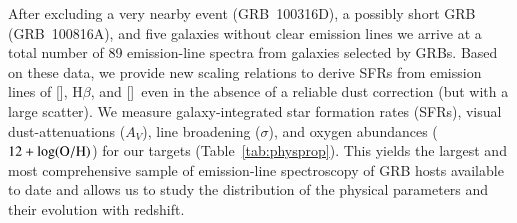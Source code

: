 \documentclass[traditabstract, longauth]{aa}
\newcommand{\hb}{H$\beta$}
\newcommand{\oh}{12+\log(\rm{O/H})}
\newcommand{\oii}{[\ion{O}{ii}]}
\newcommand{\oiii}{[\ion{O}{iii}]}
\begin{document}
After excluding a very nearby event (GRB~100316D), a possibly short GRB (GRB~100816A), and five galaxies without clear emission lines we arrive at a total number of 89 emission-line spectra from galaxies selected by GRBs. Based on these data, we provide new scaling relations to derive SFRs from emission lines of \oii, \hb, and \oiii\, even in the absence of a reliable dust correction (but with a large scatter). We measure galaxy-integrated star formation rates (SFRs), visual dust-attenuations ($A_V$), line broadening ($\sigma$), and oxygen abundances ($\oh$) for our targets (Table~\ref{tab:physprop}). This yields the largest and most comprehensive sample of emission-line spectroscopy of GRB hosts available to date and allows us to study the distribution of the physical parameters and their evolution with redshift. 
\end{document}
